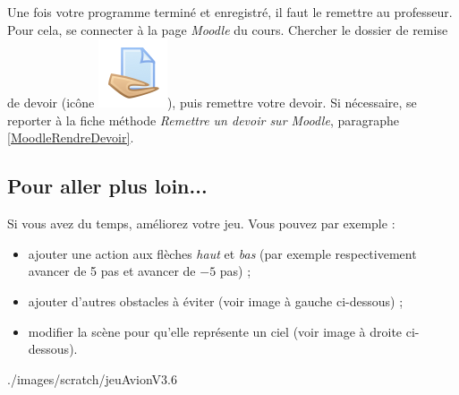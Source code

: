 Une fois votre programme terminé et enregistré, il faut le remettre au professeur. Pour cela, se connecter à la page \emph{Moodle} du cours. Chercher le dossier de remise de devoir (icône \includegraphics[width=.04\textwidth]{./images/methode/MoodleDevoirIcone1}), puis remettre votre devoir. Si nécessaire, se reporter à la fiche méthode \emph{Remettre un devoir sur Moodle}, paragraphe \vref{MoodleRendreDevoir}.





\subsection{Pour aller plus loin...}  

Si vous avez du temps, améliorez votre jeu. Vous pouvez par exemple :

\begin{itemize}
\item ajouter une action aux flèches \emph{haut} et \emph{bas} (par exemple respectivement avancer de 5 pas et avancer de $-5$ pas) ;  
\item ajouter d'autres obstacles à éviter (voir image à gauche ci-dessous) ;
\item modifier la scène pour qu'elle représente un ciel (voir image à droite ci-dessous).
\end{itemize}

%
              {./images/scratch/jeuAvionV3}{.6\textwidth}
